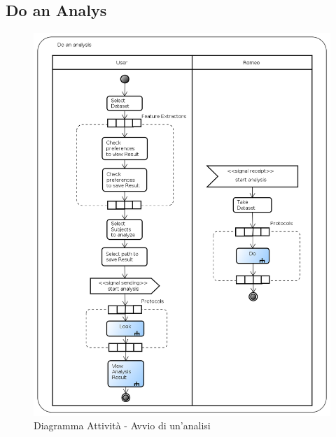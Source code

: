 \subsection{Do an Analys}
\label{doAnalysis}
\begin{figure}[!h]
\centering
\includegraphics[width=\linewidth]{./Content/Immagini/Do_an_Analysis}
\caption{Diagramma Attività - Avvio di un'analisi}
\label{analysis}
\end{figure}
\pagebreak

